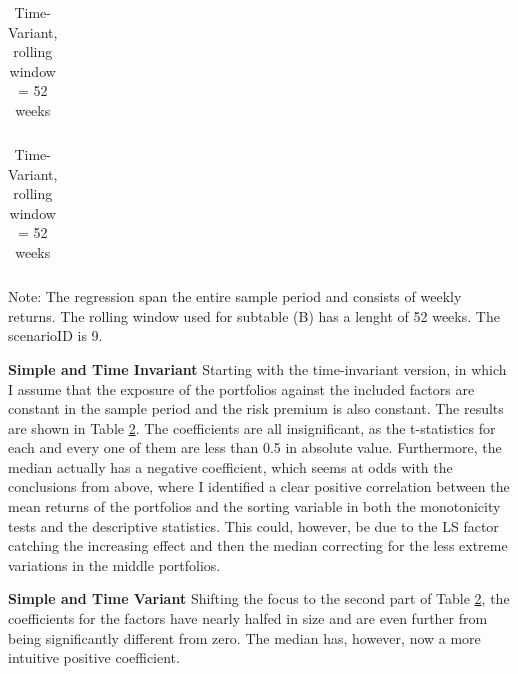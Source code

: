\begin{table}[h]
	\centering
	
	\caption[Fama-Macbeth Regression, One Factor]{Fama-Macbeth Regressions, using Median of the signal as Factor}
	\label{tab:fm_simple_9}
	
	\begin{subtable}[t]{0.55\textwidth}
		\caption[C]{Time-Invariant}
		\begin{tabular}{l|rrrr}
			
		\end{tabular}
	\end{subtable}
	
	\begin{subtable}[t]{0.55\textwidth}
		\caption[C]{Time-Variant, rolling window = 52 weeks}
		\begin{tabular}{l|rrrr}
			
		\end{tabular}
	\end{subtable}
	
	{\small Note: The regression span the entire sample period and consists of weekly returns. The rolling window used for subtable (B) has a lenght of 52 weeks. The scenarioID is 9. %
	}
	
\end{table}

\textbf{Simple and Time Invariant} Starting with the time-invariant version, in which I assume that the exposure of the portfolios against the included factors are constant in the sample period and the risk premium is also constant. The results are shown in Table \ref{tab:fm_simple_9}. The coefficients are all insignificant, as the t-statistics for each and every one of them are less than 0.5 in absolute value. Furthermore, the median actually has a negative coefficient, which seems at odds with the conclusions from above, where I identified a clear positive correlation between the mean returns of the portfolios and the sorting variable in both the monotonicity tests and the descriptive statistics. This could, however, be due to the LS factor catching the increasing effect and then the median correcting for the less extreme variations in the middle portfolios.

\textbf{Simple and Time Variant} Shifting the focus to the second part of Table \ref{tab:fm_simple_9}, the coefficients for the factors have nearly halfed in size and are even further from being significantly different from zero. The median has, however, now a more intuitive positive coefficient. 

